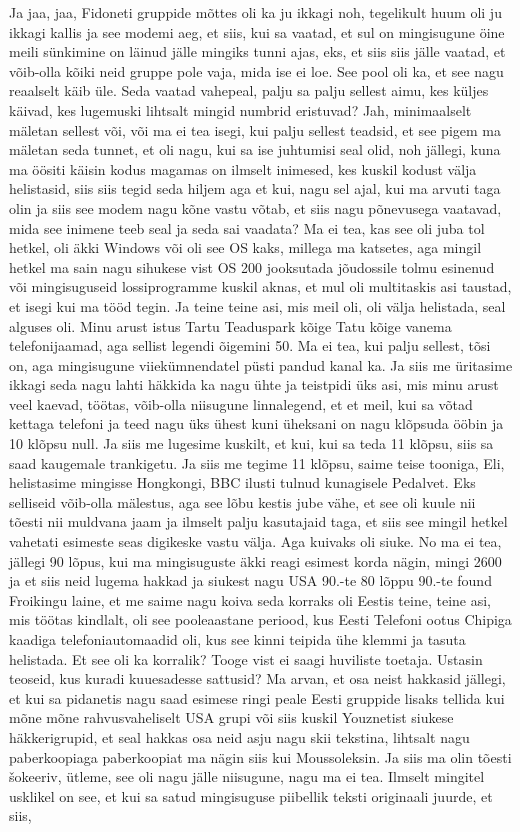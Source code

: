 Ja jaa, jaa, Fidoneti gruppide mõttes oli ka ju ikkagi noh, tegelikult huum oli ju ikkagi kallis ja see modemi aeg, et siis, kui sa vaatad, et sul on mingisugune öine meili sünkimine on läinud jälle mingiks tunni ajas, eks, et siis siis jälle vaatad, et võib-olla kõiki neid gruppe pole vaja, mida ise ei loe. See pool oli ka, et see nagu reaalselt käib üle. Seda vaatad vahepeal, palju sa palju sellest aimu, kes küljes käivad, kes lugemuski lihtsalt mingid numbrid eristuvad? Jah, minimaalselt mäletan sellest või, või ma ei tea isegi, kui palju sellest teadsid, et see pigem ma mäletan seda tunnet, et oli nagu, kui sa ise juhtumisi seal olid, noh jällegi, kuna ma öösiti käisin kodus magamas on ilmselt inimesed, kes kuskil kodust välja helistasid, siis siis tegid seda hiljem aga et kui, nagu sel ajal, kui ma arvuti taga olin ja siis see modem nagu kõne vastu võtab, et siis nagu põnevusega vaatavad, mida see inimene teeb seal ja seda sai vaadata? Ma ei tea, kas see oli juba tol hetkel, oli äkki Windows või oli see OS kaks, millega ma katsetes, aga mingil hetkel ma sain nagu sihukese vist OS 200 jooksutada jõudossile tolmu esinenud või mingisuguseid lossiprogramme kuskil aknas, et mul oli multitaskis asi taustad, et isegi kui ma tööd tegin. Ja teine teine asi, mis meil oli, oli välja helistada, seal alguses oli. Minu arust istus Tartu Teaduspark kõige Tatu kõige vanema telefonijaamad, aga sellist legendi õigemini 50. Ma ei tea, kui palju sellest, tõsi on, aga mingisugune viiekümnendatel püsti pandud kanal ka. Ja siis me üritasime ikkagi seda nagu lahti häkkida ka nagu ühte ja teistpidi üks asi, mis minu arust veel kaevad, töötas, võib-olla niisugune linnalegend, et et meil, kui sa võtad kettaga telefoni ja teed nagu üks ühest kuni üheksani on nagu klõpsuda ööbin ja 10 klõpsu null. Ja siis me lugesime kuskilt, et kui, kui sa teda 11 klõpsu, siis sa saad kaugemale trankigetu. Ja siis me tegime 11 klõpsu, saime teise tooniga, Eli, helistasime mingisse Hongkongi, BBC ilusti tulnud kunagisele Pedalvet. Eks selliseid võib-olla mälestus, aga see lõbu kestis jube vähe, et see oli kuule nii tõesti nii muldvana jaam ja ilmselt palju kasutajaid taga, et siis see mingil hetkel vahetati esimeste seas digikeske vastu välja. Aga kuivaks oli siuke. No ma ei tea, jällegi 90 lõpus, kui ma mingisuguste äkki reagi esimest korda nägin, mingi 2600 ja et siis neid lugema hakkad ja siukest nagu USA 90.-te 80 lõppu 90.-te found Froikingu laine, et me saime nagu koiva seda korraks oli Eestis teine, teine asi, mis töötas kindlalt, oli see pooleaastane periood, kus Eesti Telefoni ootus Chipiga kaadiga telefoniautomaadid oli, kus see kinni teipida ühe klemmi ja tasuta helistada. Et see oli ka korralik? Tooge vist ei saagi huviliste toetaja. Ustasin teoseid, kus kuradi kuuesadesse sattusid? Ma arvan, et osa neist hakkasid jällegi, et kui sa pidanetis nagu saad esimese ringi peale Eesti gruppide lisaks tellida kui mõne mõne rahvusvaheliselt USA grupi või siis kuskil Youznetist siukese häkkerigrupid, et seal hakkas osa neid asju nagu skii tekstina, lihtsalt nagu paberkoopiaga paberkoopiat ma nägin siis kui Moussoleksin. Ja siis ma olin tõesti šokeeriv, ütleme, see oli nagu jälle niisugune, nagu ma ei tea. Ilmselt mingitel usklikel on see, et kui sa satud mingisuguse piibellik teksti originaali juurde, et siis, 